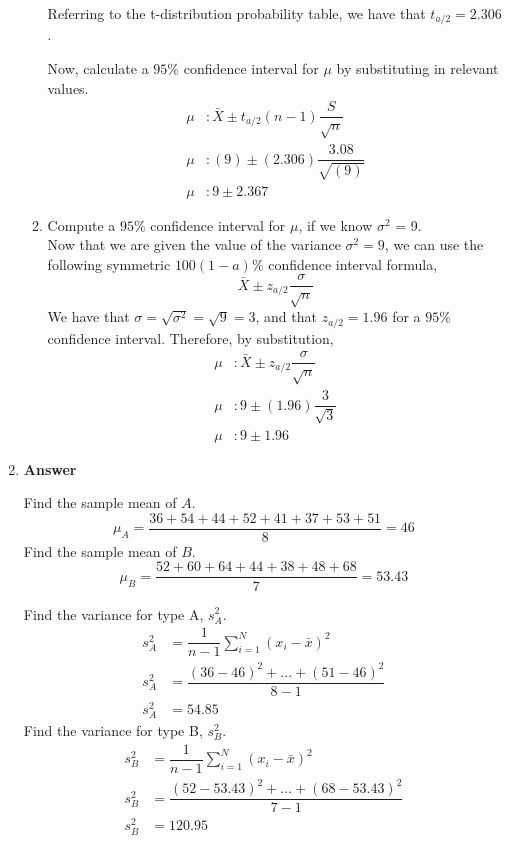 \documentclass[12pt]{book}
\begin{document}
\begin{enumerate}
\begin{enumerate}
        Referring to the t-distribution probability table, we have that $t_{a/2} = 2.306$.
        
        Now, calculate a $95\%$ confidence interval for $\mu$ by substituting in relevant values.
        \begin{align*}
            \mu &: \bar{X} \pm t_{a/2}(n-1)\dfrac{S}{\sqrt{n}}\\
            \mu &: (9) \pm (2.306)\dfrac{3.08}{\sqrt{(9)}}\\
            \mu &: 9 \pm 2.367
        \end{align*}
        
        
        \item Compute a $95\%$ confidence interval for $\mu$, if we know $\sigma^2$ = 9.\\
        
        Now that we are given the value of the variance $\sigma^2 = 9$, we can use the following symmetric $100(1-a)\%$ confidence interval formula,
        $$\bar{X} \pm z_{a/2}\dfrac{\sigma}{\sqrt{n}}$$
        We have that $\sigma = \sqrt{\sigma^2} = \sqrt{9} = 3$, and that $z_{a/2} = 1.96$ for a $95\%$ confidence interval. Therefore, by substitution,
        \begin{align*}
            \mu &: \bar{X} \pm z_{a/2}\dfrac{\sigma}{\sqrt{n}}\\
            \mu &: 9 \pm (1.96) \dfrac{3}{\sqrt{3}}\\
            \mu &: 9 \pm 1.96
        \end{align*}
    \end{enumerate}
    
    \newpage
    \item \textbf{Answer}
    
    Find the sample mean of $A$.
    $$\mu_A = \dfrac{36+54+44+52+41+37+53+51}{8} = 46$$
    Find the sample mean of $B$.
    $$\mu_B = \dfrac{52+60+64+44+38+48+68}{7} = 53.43$$
    
    Find the variance for type A, $s^2_A$.
    \begin{align*}
        s^2_A &= \dfrac{1}{n-1} \sum^N_{i=1}(x_i-\bar{x})^2\\
        s^2_A &= \dfrac{(36-46)^2 + ... + (51-46)^2}{8-1} \\
        s^2_A &= 54.85
    \end{align*}
    Find the variance for type B, $s^2_B$.
    \begin{align*}
        s^2_B &= \dfrac{1}{n-1} \sum^N_{i=1}(x_i-\bar{x})^2\\
        s^2_B &= \dfrac{(52-53.43)^2 + ... + (68-53.43)^2}{7-1} \\
        s^2_B &= 120.95
    \end{align*}
    \begin{enumerate}
        

\end{enumerate}
\end{enumerate}
\end{document}
